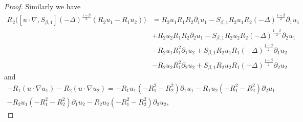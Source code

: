 \documentclass[11pt]{amsart}
\numberwithin{equation}{section}
\begin{document}
\begin{proof}
        
		Similarly we have
		\begin{align*}
			R_2\Big([ u\cdot \nabla,S_{\beta,1}](-\Delta)^{\frac{1-\beta}{2}}(R_2u_1-R_1u_2)\Big) %
			&=  R_2 u_1 R_{1} R_2 \partial_1 u_1  - S_{\beta,1} R_2 u_1 R_2 (-\Delta)^{\frac{1-\beta}{2}}\partial_1 u_1 \\
			& + R_2 u_2 R_{1} R_{2}\partial_2 u_1 - S_{\beta,1} R_2 u_2 R_2  (-\Delta)^{\frac{1-\beta}{2}}\partial_2 u_1 \\
			& - R_2 u_1 R_{1}^2 \partial_1 u_2 + S_{\beta,1} R_2 u_1 R_1 (-\Delta)^{\frac{1-\beta}{2}}\partial_1 u_2 \\
			& - R_2 u_2 R_{1}^2\partial_2 u_2 + S_{\beta,1}R_2 u_2 R_1 (-\Delta)^{\frac{1-\beta}{2}}\partial_2 u_2
		\end{align*}
		and
		\begin{align*}
			-R_1(u \cdot \nabla u_1)-R_2(u \cdot \nabla u_2) =	-R_1 u_1( -R_1^2-R_2^2) \partial_1 u_1 - R_1 u_2 (-R_1^2-R_2^2) \partial_2 u_1 \\
			-R_2 u_1(-R_1^2-R_2^2) \partial_1 u_2 - R_2 u_2 (-R_1^2-R_2^2) \partial_2 u_2, %
		\end{align*}
			
		

\end{proof}
\end{document}
